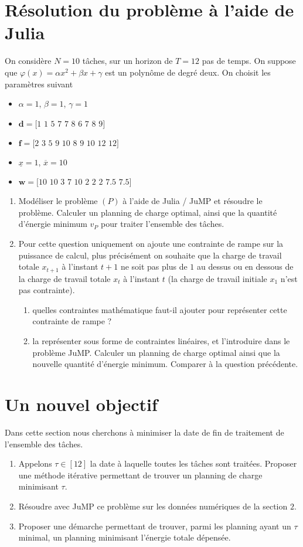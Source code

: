 \documentclass[10pt]{article}
\begin{document}
\section{Résolution du problème à l'aide de Julia}
On considère $N=10$ tâches, sur un horizon de $T=12$ pas de temps. On suppose que $\varphi(x) = \alpha x^2+ \beta x + \gamma $ est un polynôme de degré deux. On choisit les paramètres suivant
\begin{itemize}
	\item $\alpha = 1$, $\beta=1$, $\gamma = 1$
	\item $\mathbf{d}=\textrm{[1 1 5 7 7 8 6 7 8 9]}$
	\item $\mathbf{f}=\textrm{[2 3 5 9 10 8 9 10 12 12]}$
	\item $\underline{x}=1$, $\overline{x} = 10$
	\item $\mathbf{w}=\textrm{[10 10 3 7 10 2 2 2 7.5 7.5]}$
\end{itemize}
\begin{enumerate}[resume]
	\item Modéliser le problème $(P)$ à l'aide de Julia / JuMP et résoudre le problème.
	Calculer un planning de charge optimal, ainsi que la quantité d'énergie minimum $v_P$ pour traiter l'ensemble des tâches.
	\item Pour cette question uniquement on ajoute une contrainte de rampe sur la puissance de calcul, plus précisément on souhaite que la charge de travail totale $x_{t+1}$ à l'instant $t+1$ ne soit pas plus de $1$ au dessus ou en dessous de la charge de travail totale $x_t$ à l'instant $t$ (la charge de travail initiale $x_1$ n'est pas contrainte).
	\begin{enumerate}
		\item quelles contraintes mathématique faut-il ajouter pour représenter cette contrainte de rampe ?
		\item la représenter sous forme de contraintes linéaires, et l'introduire dans le problème JuMP. Calculer un planning de charge optimal ainsi que la nouvelle quantité d'énergie minimum. Comparer à la question précédente.
	\end{enumerate}
\end{enumerate}


\section{Un nouvel objectif}
Dans cette section nous cherchons à minimiser la date de fin de traitement de l'ensemble des tâches.
\begin{enumerate}[resume]
	\item Appelons $\tau \in [12]$ la date à laquelle toutes les tâches sont traitées. Proposer une méthode itérative permettant de trouver un planning de charge minimisant $\tau$.
	\item Résoudre avec JuMP ce problème sur les données numériques de la section $2$.
	\item Proposer une démarche permettant de trouver, parmi les planning ayant un $\tau$ minimal, un planning minimisant l'énergie totale dépensée.
\end{enumerate}
\end{document}

